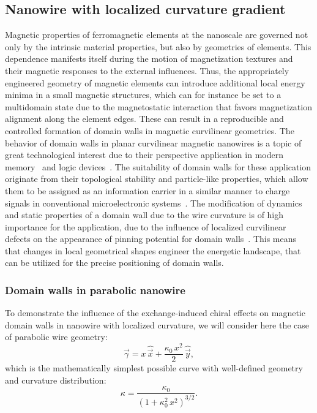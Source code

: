 \subsection{Nanowire with localized curvature gradient} \label{subsec:Parabolic_wire}

Magnetic properties of ferromagnetic elements at the nanoscale are governed not only by the intrinsic material properties, but also by geometries of elements. This dependence manifests itself during the motion of magnetization textures and their magnetic responses to the external influences. Thus, the appropriately engineered geometry of magnetic elements can introduce additional local energy minima in a small magnetic structures, which can for instance be set to a multidomain state due to the magnetostatic interaction that favors magnetization alignment along the element edges. These can result in a reproducible and controlled formation of domain walls in magnetic curvilinear geometries. The behavior of domain walls in planar curvilinear magnetic nanowires is a topic of great technological interest due to their perspective application in modern memory~\cite{Hayashi07,Parkin08} and logic devices~\cite{Allwood02,Allwood04,Allwood05,Hayashi08}. The suitability of domain walls for these application originate from their topological stability and particle-like properties, which allow them to be assigned as an information carrier in a similar manner to charge signals in conventional microelectronic systems~\cite{Klaui08,Jiang11,Negoita12}. The modification of dynamics and static properties of a domain wall due to the wire curvature is of high importance for the application, due to the influence of localized curvilinear defects on the appearance of pinning potential for domain walls~\cite{Lewis09,Glathe12,Burn14}. This means that changes in local geometrical shapes engineer the energetic landscape, that can be utilized for the precise positioning of domain walls. 

\subsubsection{Domain walls in parabolic nanowire} \label{subsubsec:Parabola_theory}

To demonstrate the influence of the exchange-induced chiral effects on magnetic domain walls in nanowire with localized curvature, we will consider here the case of parabolic wire geometry:
\begin{equation} \label{eq:parabola_wire}
	\vec{\gamma} = x \, \hat{\vec{x}} + \dfrac{\kappa_0 \, x^2}{2} \, \hat{\vec{y}},
\end{equation}
which is the mathematically simplest possible curve with well-defined geometry and curvature distribution:
\begin{equation}
	\kappa = \dfrac{\kappa_0}{(1+\kappa^2_0 \, x^2)^{3/2}}.
\end{equation}  

